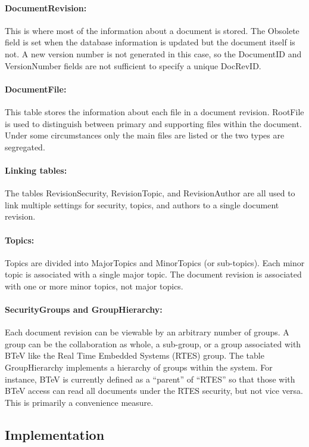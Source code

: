 \documentclass[12pt]{article}
\begin{document}
\paragraph{DocumentRevision:} This is where most of the information about a
document is stored. The Obsolete field is set when the database information is
updated but the document itself is not. A new version number is not generated in
this case, so the DocumentID and VersionNumber fields are not sufficient to
specify a unique DocRevID.

\paragraph{DocumentFile:} This table stores  the information about each file in a
document revision. RootFile is used to distinguish between primary and supporting
files within the document. Under some circumstances only the main files are listed
or the two types are segregated.

\paragraph{Linking tables:} The tables RevisionSecurity, RevisionTopic, and
RevisionAuthor are all used to link multiple settings for security, topics, and
authors to a single document revision.

\paragraph{Topics:} Topics are divided into MajorTopics and MinorTopics (or
sub-topics). Each minor topic is associated with a single major topic. The
document revision is associated with one or more minor topics, not major topics. 

\paragraph{SecurityGroups and GroupHierarchy:} Each document revision can be
viewable by an arbitrary number of groups. A group can be the collaboration as
whole, a sub-group, or a group associated with BTeV like the Real Time Embedded
Systems (RTES) group. The table GroupHierarchy implements a hierarchy of groups
within the system. For instance, BTeV is currently defined as a ``parent'' of
``RTES'' so that those with BTeV access can read all documents under the RTES
security, but not vice versa. This is primarily a convenience measure.


\subsection{Implementation}
\end{document}
